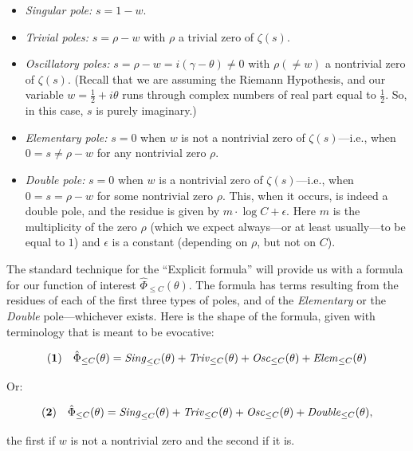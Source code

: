 \documentclass[openany]{book}
\theoremstyle{plain}
\theoremstyle{definition}
\begin{document}
{{{ \begin{itemize} \item {\it Singular pole:} $s= 1-w$.
                        \item {\it Trivial poles:}  $s= \rho-w$ with $\rho$ a trivial zero of $\zeta(s)$.
                        \item  {\it Oscillatory poles:} $s= \rho-w = i(\gamma-\theta) \ne 0$ with $\rho(\ne w)$ a nontrivial zero of $\zeta(s)$. (Recall that we are assuming the Riemann Hypothesis, and our variable $w= {\frac{1}{2}}+i\theta$ runs through complex numbers of real part equal to ${\frac{1}{2}}$. So, in this case, $s$ is purely imaginary.)
                        \item {\it Elementary pole:} $s=0$ when  $ w$ is not a nontrivial zero of $\zeta(s)$---i.e., when $0=s\ne\rho-w$ for any nontrivial zero $\rho$.
                        \item {\it Double pole:}  $s=0$ when  $ w$ is a nontrivial zero of $\zeta(s)$---i.e., when $0=s=\rho-w$ for some nontrivial zero $\rho$. This, when it occurs, is indeed a double pole, and the residue is given by $m\cdot \log C +\epsilon$.  Here $m$ is the multiplicity of the zero $\rho$  (which we expect always---or at least usually---to be equal to $1$) and $\epsilon$ is a constant (depending on $\rho$, but not on $C$).

\end{itemize}

           The standard technique for the ``Explicit formula'' will provide us with a formula for our function of interest  ${\hat \Phi}_{\le C}(\theta)$. The formula has terms resulting from the residues of each of the first three types of poles, and of the {\it Elementary} or  the  {\it Double} pole---whichever exists.  Here is the shape of the formula, given with terminology that is meant to be  evocative:



           $$ {\bf(1)}\ \ \ {\hat \Phi}_{\le C}(\theta) = {\it Sing}_{\le C}(\theta) + {\it Triv}_{\le C}(\theta) +  {\it Osc}_{\le C}(\theta) + {\it Elem}_{\le C}(\theta)$$

           Or:

           $${\bf(2)}\ \ \ {\hat \Phi}_{\le C}(\theta) = {\it Sing}_{\le C}(\theta) + {\it Triv}_{\le C}(\theta) +  {\it Osc}_{\le C}(\theta) +  {\it Double}_{\le C}(\theta),$$

           \noindent the first if $w$ is not a nontrivial zero and the second if it is.

}}}
\end{document}
